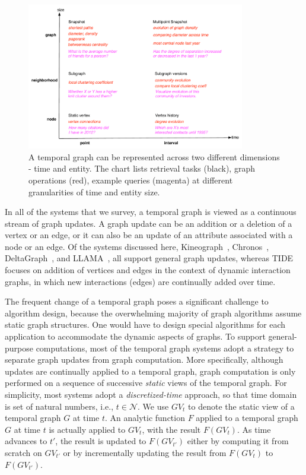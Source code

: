 \documentclass{svjour3}
\begin{document}
\begin{figure}
\centering
\includegraphics [width=0.85\textwidth]{entity-time.pdf}
\caption{A temporal graph can be represented across two different dimensions - time
and entity. The chart lists retrieval tasks (black), graph operations (red), example queries
(magenta) at different granularities of time and entity size.}
\label{fig:et}
\end{figure}





\vspace{2mm}

 In all of the systems that we survey, a temporal graph is viewed as a continuous stream of graph updates. A graph update can be an addition or a deletion of a vertex or an edge, or it can also be an update of an attribute associated with a node or an edge. Of the systems discussed here, Kineograph~\cite{kineograph}, Chronos~\cite{han2014chronos}, DeltaGraph~\cite{KhuranaD13:HistoricGraph}, and LLAMA~\cite{macko2015llama}, all support general graph updates, whereas TIDE~\cite{tide} focuses on addition of vertices and edges in the context of dynamic interaction graphs, in which new interactions (edges) are continually added over time.

The frequent change of a temporal graph poses a significant challenge to algorithm design, because the overwhelming majority of graph algorithms assume static graph structures. One would have to design special algorithms for each application to accommodate the dynamic aspects of graphs. To support general-purpose computations, most of the temporal graph systems adopt a strategy to separate graph updates from graph computation. More specifically, although updates are continually applied to a temporal graph, graph computation is only performed on a sequence of successive \emph{static} views of the temporal graph. For simplicity, most systems adopt a \emph{discretized-time} approach, so that time domain is set of natural numbers, i.e., $t\in \mathcal{N}$. We use $GV_t$ to denote the static view of a temporal graph $G$ at time $t$. An analytic function $F$ applied to a temporal graph $G$ at time $t$ is actually applied to $GV_t$, with the result $F(GV_{t})$. As time advances to $t'$, the result is updated to $F(GV_{t'})$ either by computing it from scratch on $GV_{t'}$ or by incrementally updating the result from $F(GV_{t})$ to $F(GV_{t'})$.
\end{document}
